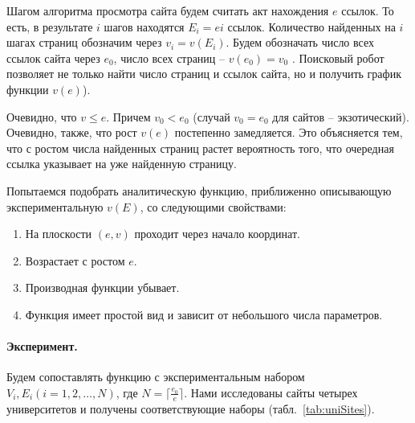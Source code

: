 Шагом алгоритма просмотра сайта будем считать акт нахождения \(e\) ссылок. То есть, в результате \(i\) шагов находятся \(E_i = ei\) ссылок. Количество найденных на \(i\) шагах страниц обозначим через \(v_i = v(E_i)\). Будем обозначать число всех ссылок сайта через \(e_0\), число всех страниц -- \(v(e_0) = v_0\) . Поисковый робот позволяет не только найти число страниц и ссылок сайта, но и получить график функции \(v(e)\)).

Очевидно, что \(v \leq e \). Причем \(v_0 < e_0\) (случай \(v_0 = e_0\) для сайтов -- экзотический). Очевидно, также, что рост \(v(e)\) постепенно замедляется. Это объясняется тем, что с ростом числа найденных страниц растет вероятность того, что очередная ссылка указывает на уже найденную страницу. 

Попытаемся подобрать аналитическую функцию, приближенно описывающую экспериментальную \(v(E)\), со следующими свойствами:
\begin{enumerate}
	\item На плоскости \((e, v)\) проходит через начало координат.
	\item Возрастает с ростом \(e\).
	\item Производная функции убывает.
	\item Функция имеет простой вид и зависит от небольшого числа параметров.
\end{enumerate}

\paragraph{Эксперимент.} Будем сопоставлять функцию с экспериментальным набором \(V_i, E_i (i = 1,2, \dots, N)\), где \(N = \lceil \frac{e_0}{e} \rceil\). Нами исследованы сайты четырех университетов и получены соответствующие наборы (табл.~\cref{tab:uniSites}).

